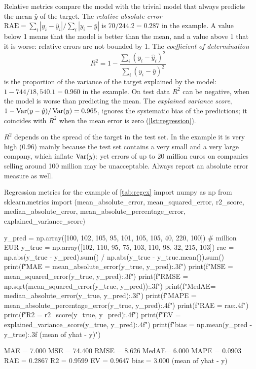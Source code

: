 Relative metrics compare the model with the trivial model that always predicts the mean
$\bar y$ of the target. The \emph{relative absolute error}
$\mathrm{RAE}=\sum_i|y_i-\hat y_i|/\sum_i|y_i-\bar y|$ is $70/244.2=0.287$ in the example. A
value below 1 means that the model is better than the mean, and a value above 1 that it is
worse: relative errors are not bounded by 1. The \emph{coefficient of determination}
\begin{equation}
  R^2=1-\frac{\sum_i(y_i-\hat y_i)^2}{\sum_i(y_i-\bar y)^2}
\end{equation}
is the proportion of the variance of the target explained by the model: $1-744/18{,}540.1=0.960$
in the example. On test data $R^2$ can be negative, when the model is worse than predicting the
mean. The \emph{explained variance score}, $1-\operatorname{Var}(y-\hat y)/\operatorname{Var}(y)=0.965$, ignores the
systematic bias of the predictions; it coincides with $R^2$ when the mean error is zero
(\cref{lst:regression}).

\begin{pitfall}
$R^2$ depends on the spread of the target in the test set. In the example it is very high
(0.96) mainly because the test set contains a very small and a very large company, which
inflate $\operatorname{Var}(y)$; yet errors of up to 20 million euros on companies selling around 100 million
may be unacceptable. Always report an absolute error measure as well.
\end{pitfall}

\begin{pylisting}[label={lst:regression}]{Regression metrics for the example of \cref{tab:regex}}
import numpy as np
from sklearn.metrics import (mean_absolute_error, mean_squared_error, r2_score,
                             median_absolute_error, mean_absolute_percentage_error,
                             explained_variance_score)

y_pred = np.array([100, 102, 105, 95, 101, 105, 105, 40, 220, 100])  # million EUR
y_true = np.array([102, 110, 95, 75, 103, 110, 98, 32, 215, 103])
rae = np.abs(y_true - y_pred).sum() / np.abs(y_true - y_true.mean()).sum()
print(f"MAE  = {mean_absolute_error(y_true, y_pred):.3f}")
print(f"MSE  = {mean_squared_error(y_true, y_pred):.3f}")
print(f"RMSE = {np.sqrt(mean_squared_error(y_true, y_pred)):.3f}")
print(f"MedAE= {median_absolute_error(y_true, y_pred):.3f}")
print(f"MAPE = {mean_absolute_percentage_error(y_true, y_pred):.4f}")
print(f"RAE  = {rae:.4f}")
print(f"R2   = {r2_score(y_true, y_pred):.4f}")
print(f"EV   = {explained_variance_score(y_true, y_pred):.4f}")
print(f"bias = {np.mean(y_pred - y_true):.3f}   (mean of yhat - y)")
\end{pylisting}
\begin{pyoutput}
MAE  = 7.000
MSE  = 74.400
RMSE = 8.626
MedAE= 6.000
MAPE = 0.0903
RAE  = 0.2867
R2   = 0.9599
EV   = 0.9647
bias = 3.000   (mean of yhat - y)
\end{pyoutput}

